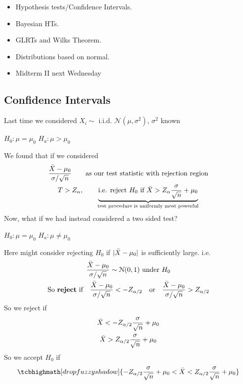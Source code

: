 \begin{itemize}
	\item Hypothesis tests/Confidence Intervals.
	\item Bayesian HTs.
	\item GLRTs and Wilks Theorem.
	\item Distributions based on normal.
	\item Midterm II next Wednesday
\end{itemize}
\subsection*{Confidence Intervals}
Last time we considered $X_i \sim$ i.i.d. $\mathcal{N}(\mu, \sigma^2)$, $\sigma^2$ known
\begin{center}
	$H_0: \mu = \mu_0$ \qquad $H_a: \mu > \mu_0$
\end{center}
We found that if we considered
\begin{gather*}
	\frac{\bar{X} - \mu_0}{\sigma / \sqrt{n}} \qquad \text{as our test statistic with rejection region}\\
	T > Z_{\alpha}, \qquad \underbrace{\text{i.e. reject $H_0$ if } \bar{X} > Z_{\alpha} \frac{\sigma}{\sqrt{n}} + \mu_0}_{\text{test procedure is uniformly most powerful}}
\end{gather*}
Now, what if we had instead considered a two sided test?
\begin{center}
	$H_0: \mu = \mu_0$ \qquad $H_a: \mu \neq \mu_0$
\end{center}
Here might consider rejecting $H_0$ if $| \bar{X} - \mu_0|$ is sufficiently large. i.e.
\begin{gather*}
	\frac{\bar{X} - \mu_0}{\sigma / \sqrt{n}} \sim \mathcal{N}(0, 1) \text{ under } H_0\\
\text{So }	\textbf{reject} \text{ if} \quad \frac{\bar{X} - \mu_0}{\sigma / \sqrt{n}} < -Z_{\alpha / 2} \quad \text{or}  \quad \frac{\bar{X} - \mu_0}{\sigma / \sqrt{n}} > Z_{\alpha / 2}
\end{gather*}
So we reject if
\begin{gather*}
	\bar{X} < -Z_{\alpha/2} \frac{\sigma}{\sqrt{n}} + \mu_0\\
	\bar{X} > Z_{\alpha/2} \frac{\sigma}{\sqrt{n}} + \mu_0\\
\end{gather*}
So we accept $H_0$ if 
\begin{gather*}
		\tcbhighmath[drop fuzzy shadow]{-Z_{\alpha/2} \frac{\sigma}{\sqrt{n}} + \mu_0 < \bX < Z_{\alpha/2} \frac{\sigma}{\sqrt{n}} + \mu_0}
\end{gather*}
